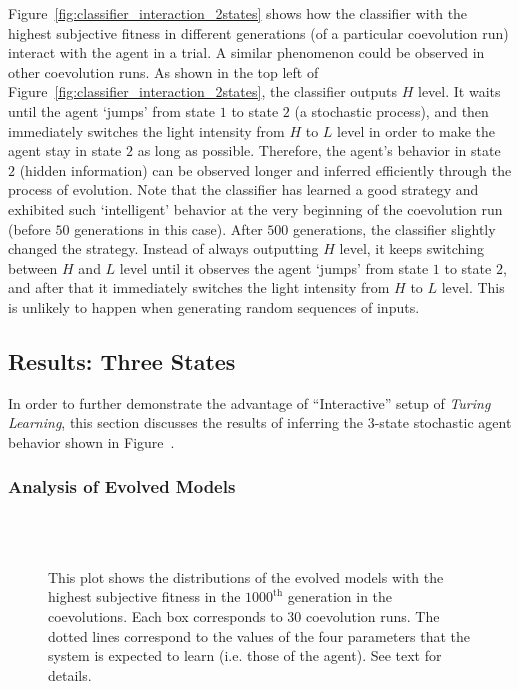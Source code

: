 Figure~\ref{fig:classifier_interaction_2states} shows how the classifier with the highest subjective fitness in different generations (of a particular coevolution run) interact with the agent in a trial. A similar phenomenon could be observed in other coevolution runs. As shown in the top left of Figure~\ref{fig:classifier_interaction_2states}, the classifier outputs $H$ level. It waits until the agent `jumps' from state $1$ to state $2$ (a stochastic process), and then immediately switches the light intensity from $H$ to $L$ level in order to make the agent stay in state $2$ as long as possible. Therefore, the agent's behavior in state $2$ (hidden information) can be observed longer and inferred efficiently through the process of evolution. Note that the classifier has learned a good strategy and exhibited such `intelligent' behavior at the very beginning of the coevolution run (before $50$ generations in this case). After $500$ generations, the classifier slightly changed the strategy. Instead of always outputting $H$ level, it keeps switching between $H$ and $L$ level until it observes the agent `jumps' from state $1$ to state $2$, and after that it immediately switches the light intensity from $H$ to $L$ level. This is unlikely to happen when generating random sequences of inputs.

\subsection{Results: Three States}\label{sec:results_interaction_stochastic_3states}

In order to further demonstrate the advantage of ``Interactive'' setup of \textit{Turing Learning}, this section discusses the results of inferring the 3-state stochastic agent behavior shown in Figure~. 

\subsubsection{Analysis of Evolved Models}
\begin{figure}[!t]%
	\centering
		\\
		\\
		\caption{This plot shows the distributions of the evolved models with the highest subjective fitness in the $1000^\textrm{th}$ generation in the coevolutions. Each box corresponds to $30$ coevolution runs. The dotted lines correspond to the values of the four parameters that the system is expected to learn (i.e. those of the agent). See text for details.\label{fig:parameters_box_stochastic_three_states}}
\end{figure}

